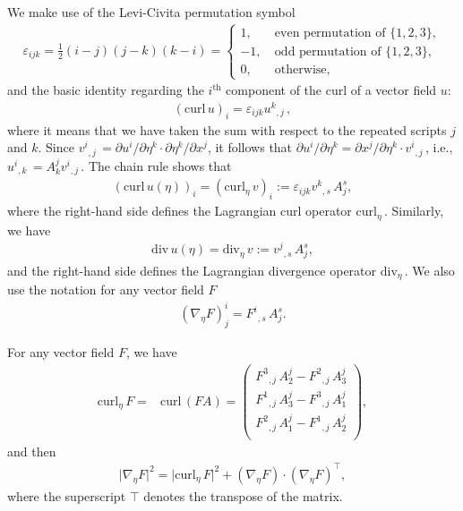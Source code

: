 \documentclass[12pt,twoside,reqno]{amsart}
\numberwithin{equation}{section}
\theoremstyle{definition}
\theoremstyle{remark}
\begin{document}
We make use of the Levi-Civita permutation symbol
\begin{align*}
  {\varepsilon}_{ijk}=\frac{1}{2}(i-j)(j-k)(k-i)=\left\{\begin{array}{ll}
  1,\quad &\text{even permutation of } \{1,2,3\},\\
  -1,&  \text{odd permutation of } \{1,2,3\},\\
  0,& \text{otherwise},
  \end{array}\right.
\end{align*}
and the basic identity regarding the $i^{\mathrm{th}}$ component of the curl of a vector field $u$:
\begin{align*}
  ({\mathrm{curl}\,} u)_i={\varepsilon}_{ijk} {{{u^k}}_{,{j}}\,},
\end{align*}
where it means that we have taken the sum with respect to the repeated scripts $j$ and $k$. Since ${{{v^i}}_{,{j}}\,}={\partial} u^i/{\partial} \eta^k\cdot {\partial}\eta^k/{\partial} x^j$, it follows that ${\partial} u^i/{\partial} \eta^k={\partial} x^j/{\partial}\eta^k\cdot{{{v^i}}_{,{j}}\,}$, i.e., ${{{u^i}}_{,{k}}\,}=A_k^j{{{v^i}}_{,{j}}\,}$. The chain rule shows that
\begin{align*}
  ({\mathrm{curl}\,} u(\eta))_i=({\mathrm{curl}_\eta\,} v)_i:={\varepsilon}_{ijk} {{{v^k}}_{,{s}}\,}A_j^s,
\end{align*}
where the right-hand side defines the Lagrangian curl operator ${\mathrm{curl}_\eta\,}$. Similarly, we have
\begin{align*}
  {\mathrm{div}\,} u(\eta)={\mathrm{div}_{\!\eta}\,} v:={{{v^j}}_{,{s}}\,}A_j^s,
\end{align*}
and the right-hand side defines the Lagrangian divergence operator ${\mathrm{div}_{\!\eta}\,}$. We also use the notation for any vector field $F$
\begin{align}
  ({\nabla}_\eta F)_j^i={{{F^i}}_{,{s}}\,}A_j^s .
\end{align}

For any vector field $F$, we have
\begin{align*}
  {\mathrm{curl}_\eta\,} F=&{\mathrm{curl}\,}(FA)=\begin{pmatrix}
                          {{{F^3}}_{,{j}}\,}A^j_2-{{{F^2}}_{,{j}}\,}A^j_3 \\
                          {{{F^1}}_{,{j}}\,}A^j_3-{{{F^3}}_{,{j}}\,}A^j_1 \\
                          {{{F^2}}_{,{j}}\,}A^j_1-{{{F^1}}_{,{j}}\,}A^j_2 \\
                        \end{pmatrix},
\end{align*}
and then
\begin{align}\label{eq.curletaF2}
  {\vert{{\nabla}_\eta F}\vert}^2={\vert{{\mathrm{curl}_\eta\,} F}\vert}^2+({\nabla}_\eta F)\cdot({\nabla}_\eta F)^\top,
\end{align}
where the superscript $\top$ denotes the transpose of the matrix.
\end{document}
